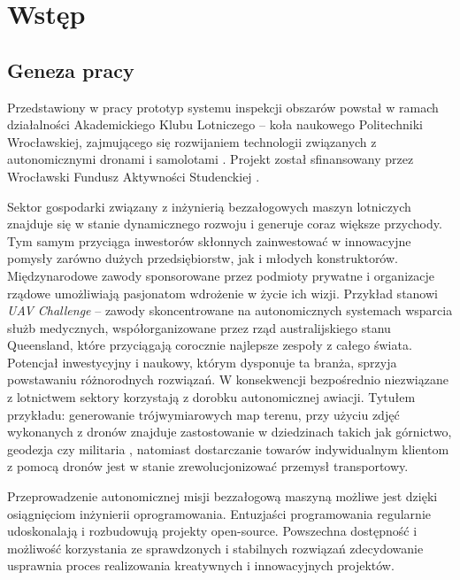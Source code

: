 \chapter{Wstęp} \label{chapter_intro}


\section{Geneza pracy} \label{intro_genesis}

Przedstawiony w pracy prototyp systemu inspekcji obszarów powstał w ramach działalności
Akademickiego Klubu Lotniczego -- koła naukowego Politechniki Wrocławskiej, zajmującego
się rozwijaniem technologii związanych z autonomicznymi dronami i samolotami
\cite{akl_home_page}. Projekt został sfinansowany przez Wrocławski Fundusz
Aktywności Studenckiej \cite{fast_webpage}.

Sektor gospodarki związany z inżynierią bezzałogowych maszyn lotniczych znajduje się
w stanie dynamicznego rozwoju i generuje coraz większe przychody.
Tym samym przyciąga inwestorów skłonnych zainwestować w innowacyjne pomysły zarówno 
dużych przedsiębiorstw, jak i młodych konstruktorów. Międzynarodowe zawody sponsorowane
przez podmioty prywatne i organizacje rządowe umożliwiają pasjonatom wdrożenie w życie
ich wizji. Przykład stanowi \textit{UAV Challenge} -- zawody skoncentrowane na
autonomicznych systemach wsparcia służb medycznych, współorganizowane przez rząd
australijskiego stanu Queensland, które przyciągają corocznie najlepsze zespoły z całego
świata\cite{uav_sponsors}. Potencjał inwestycyjny i naukowy, którym dysponuje ta branża,
sprzyja powstawaniu różnorodnych rozwiązań. W konsekwencji bezpośrednio niezwiązane z
lotnictwem sektory korzystają z dorobku autonomicznej awiacji. Tytułem przykładu: 
generowanie trójwymiarowych map terenu, przy użyciu zdjęć wykonanych z dronów znajduje
zastostowanie w dziedzinach takich jak górnictwo, geodezja czy militaria
\cite{uav_photogrametry}, natomiast dostarczanie towarów indywidualnym klientom z pomocą
dronów jest w stanie zrewolucjonizować przemysł transportowy.

Przeprowadzenie autonomicznej misji bezzałogową maszyną możliwe jest dzięki osiągnięciom
inżynierii oprogramowania. Entuzjaści programowania regularnie udoskonalają i rozbudowują
projekty open-source. Powszechna dostępność i możliwość korzystania ze sprawdzonych
i stabilnych rozwiązań zdecydowanie usprawnia proces realizowania
kreatywnych i innowacyjnych projektów. 
  

